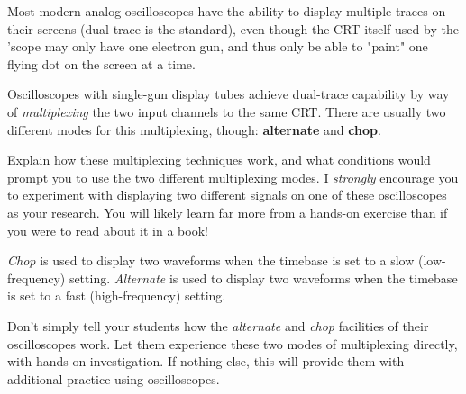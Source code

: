 

Most modern analog oscilloscopes have the ability to display multiple traces on their screens (dual-trace is the standard), even though the CRT itself used by the 'scope may only have one electron gun, and thus only be able to "paint" one flying dot on the screen at a time.

Oscilloscopes with single-gun display tubes achieve dual-trace capability by way of {\it multiplexing} the two input channels to the same CRT.  There are usually two different modes for this multiplexing, though: {\bf alternate} and {\bf chop}.

Explain how these multiplexing techniques work, and what conditions would prompt you to use the two different multiplexing modes.  I {\it strongly} encourage you to experiment with displaying two different signals on one of these oscilloscopes as your research.  You will likely learn far more from a hands-on exercise than if you were to read about it in a book!







{\it Chop} is used to display two waveforms when the timebase is set to a slow (low-frequency) setting.  {\it Alternate} is used to display two waveforms when the timebase is set to a fast (high-frequency) setting.







Don't simply tell your students how the {\it alternate} and {\it chop} facilities of their oscilloscopes work.  Let them experience these two modes of multiplexing directly, with hands-on investigation.  If nothing else, this will provide them with additional practice using oscilloscopes.




